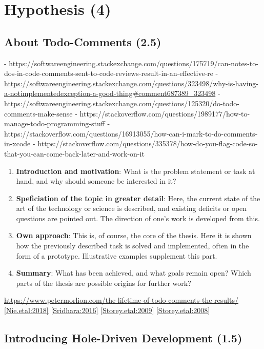 \section{Hypothesis (4)}
\subsection{About Todo-Comments (2.5)}
- https://softwareengineering.stackexchange.com/questions/175719/can-notes-to-dos-in-code-comments-sent-to-code-reviews-result-in-an-effective-re
- \url{https://softwareengineering.stackexchange.com/questions/323498/why-is-having-a-notimplementedexception-a-good-thing#comment687389_323498}
- https://softwareengineering.stackexchange.com/questions/125320/do-todo-comments-make-sense
- https://stackoverflow.com/questions/1989177/how-to-manage-todo-programming-stuff
- https://stackoverflow.com/questions/16913055/how-can-i-mark-to-do-comments-in-xcode
- https://stackoverflow.com/questions/335378/how-do-you-flag-code-so-that-you-can-come-back-later-and-work-on-it

\begin{enumerate}
	\item \textbf{Introduction and motivation}: What is the problem statement or
	task at hand, and why should someone be interested in it?
	\item \textbf{Speficiation of the topic in greater detail}: Here, the
	current state of the art of the technology or science is described, and
	existing deficits or open questions are pointed out. The direction of one's
	work is developed from this.
	\item \textbf{Own approach}: This is, of course, the core of the thesis.
	Here it is shown how the previously described task is solved and
	implemented, often in the form of a prototype. Illustrative examples
	supplement this part.
	\item \textbf{Summary}: What has been achieved, and what goals remain open?
	Which parts of the thesis are possible origins for further work?
\end{enumerate}


\url{https://www.petermorlion.com/the-lifetime-of-todo-comments-the-results/}
\autoref{Nie.etal:2018}
\autoref{Sridhara:2016}
\autoref{Storey.etal:2009}
\autoref{Storey.etal:2008}

\subsection{Introducing Hole-Driven Development (1.5)}

